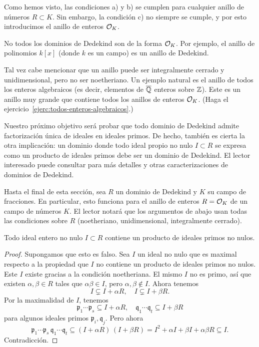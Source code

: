 Como hemos visto, las condiciones a) y b) se cumplen para cualquier anillo
de números $R \subset K$. Sin embargo, la condición c) no siempre se cumple,
y por esto introducimos el anillo de enteros $\mathcal{O}_K$.

No todos los dominios de Dedekind son de la forma $\mathcal{O}_K$. Por ejemplo,
el anillo de polinomios $k[x]$ (donde $k$ es un campo) es un anillo de Dedekind.

\begin{comentario}
  Tal vez cabe mencionar que un anillo puede ser integralmente cerrado y
  unidimensional, pero no ser noetheriano. Un ejemplo natural es el anillo de
  todos los enteros algebraicos (es decir, elementos de $\overline{\mathbb{Q}}$ enteros
  sobre $\mathbb{Z}$). Este es un anillo muy grande que contiene todos los anillos de
  enteros $\mathcal{O}_K$. (Haga el ejercicio~\ref{ejerc:todos-enteros-algebraicos}.)
\end{comentario}

Nuestro próximo objetivo será probar que todo dominio de Dedekind admite
factorización única de ideales en ideales primos. De hecho, también es cierta
la otra implicación: un dominio donde todo ideal propio no nulo $I \subset R$
se expresa como un producto de ideales primos debe ser un dominio de
Dedekind. El lector interesado puede consultar \cite[Chapter 20]{Clark-CA} para
más detalles y otras caracterizaciones de dominios de Dedekind.

\vspace{1em}

Hasta el final de esta sección, sea $R$ un dominio de Dedekind y $K$ su campo
de fracciones. En particular, esto funciona para el anillo de enteros
$R = \mathcal{O}_K$ de un campo de números $K$. El lector notará que los argumentos
de abajo usan todas las condiciones sobre $R$ (noetheriano, unidimensional,
integralmente cerrado).

\begin{lema}
  Todo ideal entero no nulo $I \subset R$ contiene un producto de ideales
  primos no nulos.

  \begin{proof}
    Supongamos que esto es falso. Sea $I$ un ideal no nulo que es maximal
    respecto a la propiedad que $I$ no contiene un producto de ideales primos
    no nulos. Este $I$ existe gracias a la condición noetheriana. El mismo $I$
    no es primo, así que existen $\alpha,\beta \in R$ tales que
    $\alpha\beta \in I$, pero $\alpha,\beta \notin I$. Ahora tenemos
    $$I \subsetneq I + \alpha R, \quad I \subsetneq I + \beta R.$$
    Por la maximalidad de $I$, tenemos
    \[ \mathfrak{p}_1\cdots\mathfrak{p}_s \subseteq I + \alpha R, \quad
       \mathfrak{q}_1\cdots\mathfrak{q}_t \subseteq I + \beta R \]
    para algunos ideales primos $\mathfrak{p}_i, \mathfrak{q}_j$.
    Pero ahora
    \[ \mathfrak{p}_1\cdots\mathfrak{p}_s\,\mathfrak{q}_1\cdots\mathfrak{q}_t
       \subseteq (I + \alpha R)\,(I + \beta R) =
       I^2 + \alpha I + \beta I + \alpha\beta R \subseteq I. \]
    Contradicción.
  \end{proof}
\end{lema}

